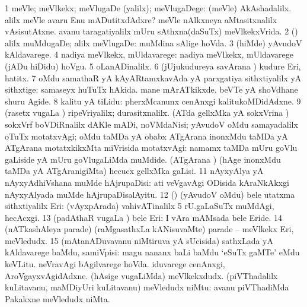 {{\bentry
{} 
\gl{\kirxvi}
\expl{}
\bmng
\bnum
\num{1} meVle; meVlkekx; meVlugaDe (yalilx); meVlugaDege:  (meVle) AkAshadalilx.  alilx meVle avaru Enu mADutitxdAdxre?  meVle nAlkxneya aMtasitxnalilx vAsisutAtxne.  avanu taragatiyalilx mUru sAthxna(daSuTx) meVlkekxVrida. 
\num{2} (\AmA) alilx muMdugaDe; alilx meVlugaDe:  muMdina sAlige hoVda. 
\num{3} (hiMde) yAvudoV kAldavarege. 
\num{4} nadiya meVlkekx, mUldavarege:  nadiya meVlkekx, mUldavarege (jADu hiDidu) hoVgu. 
\num{5} oLanADinalilx. 
\num{6} (jUjukudureya savArana \vi) kudure Eri, hatitx. 
\num{7} oMdu samathaR yA kAyARtamxkavAda yA parxgatiya sithxtiyalilx yA sithxtige:  samaseyx huTuTx hAkida.  mane mArATkikxde.  beVTe yA shoVdhane shuru Agide. 
\num{8} kalitu yA tiLidu:  pherxMcanunx cenAnxgi kalitukoMDidAdxne. 
\num{9} (rasetx \mo vugaLa \vi) ripeVriyalilx; durasitxnalilx. 
\banum
{} (ATda gellxMka yA sokxVrina \vi) sokxVrf boVDiRnalilx dAKle mADi, noVMdaNisi; yAvudoV oMdu samayadalilx oTuTx motatxvAgi; oMdu taMDa yA obabx ATgArana inonxMdu taMDa yA ATgArana motatxkikxMta miVrisida motatxvAgi:  namamx taMDa mUru goVlu gaLiside yA mUru goVlugaLiMda muMdide. 
 (ATgArana \vi) (hAge inonxMdu taMDa yA ATgAranigiMta) hecucx gellxMka gaLisi. 
\eanum
\numie
\num{11} nAyxyAlya yA nAyxyAdhiVshana muMde hAjrupaDisi:  ati veVgavAgi ODisida kAraNkAkxgi nAyxyAlyada muMde hAjrupaDisalAyitu. 
\num{12} (\birx) (yAvudoV oMdu) bele utatxma sithxtiyalilx Eri:  (vAyxpArada) vahivATinalilx 5 rU.gaLaSuTx muMdAgi, hecAcxgi. 
\num{13} (padAthaR \mo vugaLa \vi) bele Eri:  I vAra mAMsada bele Eride. 
\num{14} (nATkashAleya parade) (raMgasathxLa kANisuvaMte) parade -- meVlkekx Eri, meVledudx. 
\num{15} (mAtanADuvavanu niMtiruva yA sUcisida) sathxLada yA kAldavarege baMdu, samiVpisi:  magu nananx baLi baMdu `eSuTx gaMTe' eMdu keVLitu.  neVravAgi bAgilvarege hoVda.  iduvarege cenAnxgi, AroVgayxvAgidAdxne. 
\banum
{} (hAsige \mo vugaLiMda) meVlkekxdudx. 
 (piVThadalilx kuLitavanu, maMDiyUri kuLitavanu) meVledudx niMtu:  avanu piVThadiMda Pakakxne meVledudx niMta. 
}}
